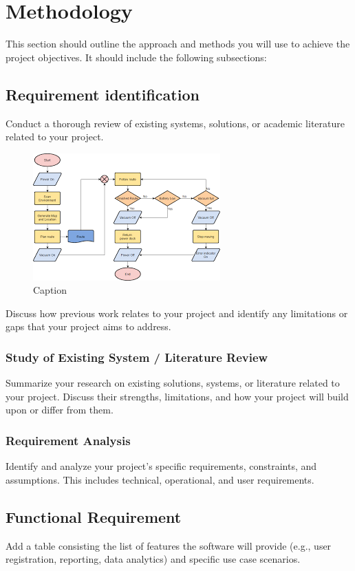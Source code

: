 \section{Methodology}
This section should outline the approach and methods you will use to achieve the project objectives. It should include the following subsections:

\subsection{Requirement identification}
Conduct a thorough review of existing systems, solutions, or academic literature related to your project. 
\begin{figure}[h]
    \centering
    \includegraphics[width=0.5\linewidth]{Images/flow.png}
    \caption{Caption}
    \label{fig:enter-label}
\end{figure}
Discuss how previous work relates to your project and identify any limitations or gaps that your project aims to address.

\subsubsection{Study of Existing System / Literature Review}
Summarize your research on existing solutions, systems, or literature related to your project. Discuss their strengths, limitations, and how your project will build upon or differ from them.

\subsubsection{Requirement Analysis}
Identify and analyze your project's specific requirements, constraints, and assumptions. This includes technical, operational, and user requirements.

\subsection{Functional Requirement}
Add a table consisting the list of features the software will provide (e.g., user registration, reporting, data analytics) and specific use case scenarios.
